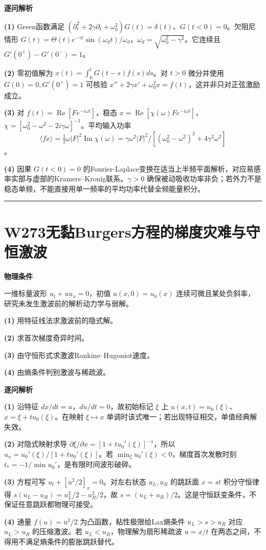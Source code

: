 \documentclass[UTF8,a4paper,11pt,oneside,openany]{ctexbook}
\begin{document}
\par\medskip\noindent\textbf{逐问解析}
\par\noindent\textbf{(1)} Green函数满足 \((\partial_t^2+2\gamma\partial_t+\omega_0^2)G(t)=\delta(t)\)、\(G(t<0)=0\)。欠阻尼情形 \(G(t)=\Theta(t)e^{-\gamma t}\sin(\omega_dt)/\omega_d\)，\(\omega_d=\sqrt{\omega_0^2-\gamma^2}\)。它连续且 \(G'(0^+)-G'(0^-)=1\)。
\par\noindent\textbf{(2)} 零初值解为 \(x(t)=\int_0^tG(t-s)f(s)ds\)。对 \(t>0\) 微分并使用 \(G(0)=0,G'(0^+)=1\) 可核验 \(x''+2\gamma x'+\omega_0^2x=f(t)\)，这并非只对正弦激励成立。
\par\noindent\textbf{(3)} 对 \(f(t)=\operatorname{Re}[F e^{-i\omega t}]\)，稳态 \(x=\operatorname{Re}[\chi(\omega)F e^{-i\omega t}]\)，\(\chi=[\omega_0^2-\omega^2-2i\gamma\omega]^{-1}\)。平均输入功率 \[\langle f\dot x\rangle=\tfrac12\omega|F|^2\operatorname{Im}\chi(\omega)=\gamma\omega^2|F|^2/[(\omega_0^2-\omega^2)^2+4\gamma^2\omega^2]\]。
\par\noindent\textbf{(4)} 因果 \(G(t<0)=0\) 的Fourier-Laplace变换在适当上半频平面解析，对应易感率实部与虚部的Kramers–Kronig联系。\(\gamma>0\) 确保被动吸收功率非负；若外力不是稳态单频，不能直接用单一频率的平均功率代替全频能量积分。

\par\bigskip\hrule\bigskip
\section*{W273\quad 无黏Burgers方程的梯度灾难与守恒激波}
\textbf{物理条件}\par 一维标量波形 \(u_t+uu_x=0\)，初值 \(u(x,0)=u_0(x)\) 连续可微且某处负斜率，研究未发生激波前的解析动力学与弱解。
\par\noindent\textbf{(1)} 用特征线法求激波前的隐式解。
\par\noindent\textbf{(2)} 求首次梯度奇异时间。
\par\noindent\textbf{(3)} 由守恒形式求激波Rankine–Hugoniot速度。
\par\noindent\textbf{(4)} 由熵条件判别激波与稀疏波。

\par\medskip\noindent\textbf{逐问解析}
\par\noindent\textbf{(1)} 沿特征 \(dx/dt=u\)，\(du/dt=0\)，故初始标记 \(\xi\) 上 \(u(x,t)=u_0(\xi)\)、\(x=\xi+t u_0(\xi)\)。在映射 \(\xi\mapsto x\) 单调时该式唯一；若出现特征相交，单值经典解失效。
\par\noindent\textbf{(2)} 对隐式映射求导 \(\partial\xi/\partial x=[1+t u_0'(\xi)]^{-1}\)，所以 \(u_x=u_0'(\xi)/[1+t u_0'(\xi)]\)。若 \(\min_\xi u_0'(\xi)<0\)，梯度首次发散时刻 \(t_*=-1/\min u_0'\)，是有限时间波形破碎。
\par\noindent\textbf{(3)} 方程可写 \(u_t+[u^2/2]_x=0\)。对左右状态 \(u_L,u_R\) 的跳跃面 \(x=s t\) 积分守恒律得 \(s(u_L-u_R)=u_L^2/2-u_R^2/2\)，故 \(s=(u_L+u_R)/2\)。这是守恒跃变条件，不保证任意跳跃都物理可接受。
\par\noindent\textbf{(4)} 通量 \(f(u)=u^2/2\) 为凸函数，粘性极限给Lax熵条件 \(u_L>s>u_R\) 对应 \(u_L>u_R\) 的压缩激波。若 \(u_L<u_R\)，物理解为扇形稀疏波 \(u=x/t\) 在两态之间，不得用不满足熵条件的膨胀跳跃替代。
\end{document}
